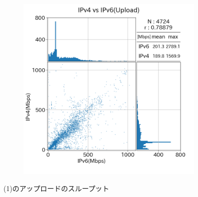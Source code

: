 \begin{figure}[htbp]
\begin{center}
\begin{subfigure}[b]{0.49\textwidth}
            \includegraphics[width=1.0\textwidth]{fig/old_diffISP_ul.png}
            \label{old_diffISP_ul}
        \end{subfigure}
        \caption{(1)のアップロードのスループット}
        \label{fig:old_isp_ul}


\end{center}
\end{figure}
